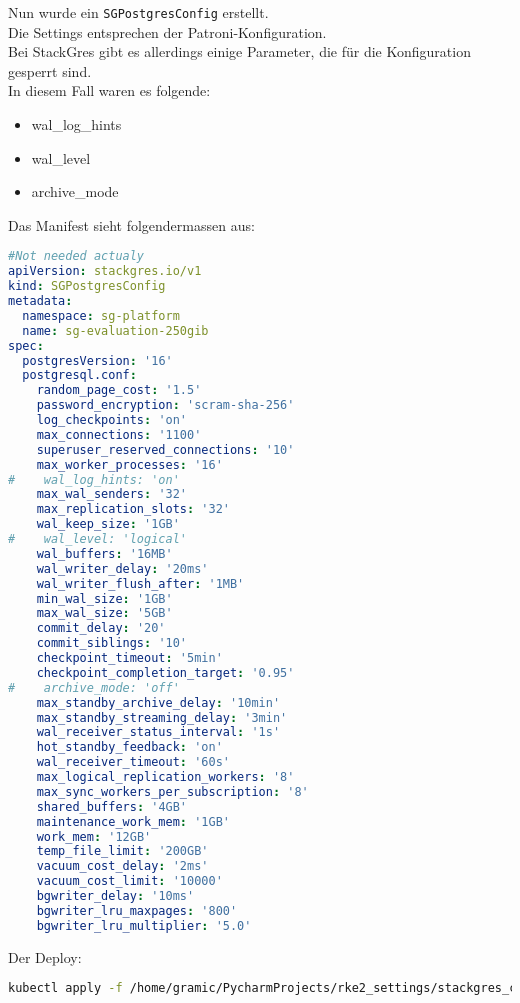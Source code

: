 Nun wurde ein \texttt{SGPostgresConfig} erstellt.\\
Die Settings entsprechen der Patroni-Konfiguration.\\
Bei StackGres gibt es allerdings einige Parameter, die für die Konfiguration gesperrt sind.\\
In diesem Fall waren es folgende:
\begin{itemize}
  \item wal\_log\_hints
  \item wal\_level
  \item archive\_mode
\end{itemize}

Das Manifest sieht folgendermassen aus:
\lstset{style=gra_codestyle}
\begin{lstlisting}[language=yaml, caption=StackGres-Citus - Benchmarking - SGPostgresConfig,captionpos=b,label={lst:SGPostgresConfig.yaml},breaklines=true]
#Not needed actualy
apiVersion: stackgres.io/v1
kind: SGPostgresConfig
metadata:
  namespace: sg-platform
  name: sg-evaluation-250gib
spec:
  postgresVersion: '16'
  postgresql.conf:
    random_page_cost: '1.5'
    password_encryption: 'scram-sha-256'
    log_checkpoints: 'on'
    max_connections: '1100'
    superuser_reserved_connections: '10'
    max_worker_processes: '16'
#    wal_log_hints: 'on'
    max_wal_senders: '32'
    max_replication_slots: '32'
    wal_keep_size: '1GB'
#    wal_level: 'logical'
    wal_buffers: '16MB'
    wal_writer_delay: '20ms'
    wal_writer_flush_after: '1MB'
    min_wal_size: '1GB'
    max_wal_size: '5GB'
    commit_delay: '20'
    commit_siblings: '10'
    checkpoint_timeout: '5min'
    checkpoint_completion_target: '0.95'
#    archive_mode: 'off'
    max_standby_archive_delay: '10min'
    max_standby_streaming_delay: '3min'
    wal_receiver_status_interval: '1s'
    hot_standby_feedback: 'on'
    wal_receiver_timeout: '60s'
    max_logical_replication_workers: '8'
    max_sync_workers_per_subscription: '8'
    shared_buffers: '4GB'
    maintenance_work_mem: '1GB'
    work_mem: '12GB'
    temp_file_limit: '200GB'
    vacuum_cost_delay: '2ms'
    vacuum_cost_limit: '10000'
    bgwriter_delay: '10ms'
    bgwriter_lru_maxpages: '800'
    bgwriter_lru_multiplier: '5.0'
\end{lstlisting}

Der Deploy:
\lstset{style=gra_codestyle}
\begin{lstlisting}[language=bash, caption=StackGres-Citus - Benchmark - Deploy SGPostgresConfig,captionpos=b,label={lst:stackgres_citus-benchmnarking-deploy-SGPostgresConfig},breaklines=true]
kubectl apply -f /home/gramic/PycharmProjects/rke2_settings/stackgres_citus/stackgres_citus/SGPostgresConfig.yaml
\end{lstlisting}

